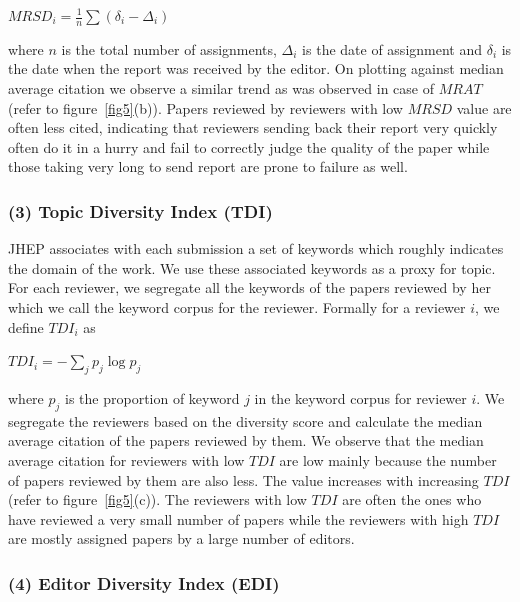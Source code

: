 \begin{center}
$MRSD_{i}=\frac{1}{n}\sum(\delta_{i}-\Delta_{i})$
\end{center}

where $n$ is the total number of assignments, $\Delta_{i}$ is the date of assignment and $\delta_{i}$ is the date when the report was received by the editor. On plotting against median average citation we observe a similar trend as was observed in case of $MRAT$ (refer to figure~\ref{fig5}(b)). Papers reviewed by reviewers with low $MRSD$ value are often less cited, indicating that reviewers sending back their report very quickly often do it in a hurry and fail to correctly judge the quality of the paper while those taking very long to send report are prone to failure as well. 

\subsubsection*{(3) Topic Diversity Index (TDI)}

JHEP associates with each submission a set of keywords which roughly indicates the domain of the work. We use these associated keywords as a proxy for topic. For each reviewer, we segregate all the keywords of the papers reviewed by her which we call the keyword corpus for the reviewer. Formally for a reviewer $i$, we define $TDI_{i}$ as 

\begin{center}
$TDI_{i}=-\sum \limits_{j} p_{j}\log p_{j}$
\end{center}

\noindent where $p_{j}$ is the proportion of keyword $j$ in the keyword corpus for reviewer $i$. We segregate the reviewers based on the diversity score and calculate the median average citation of the papers reviewed by them. We observe that the median average citation %
for reviewers with low $TDI$ are low mainly because the number of papers reviewed by them are also less. The value increases with  increasing $TDI$ (refer to figure~\ref{fig5}(c)). The reviewers with low $TDI$ are often the ones who have reviewed a very small number of papers while the reviewers with high $TDI$ are mostly assigned papers by a large number of editors. 
 
 
 
\subsubsection*{(4) Editor Diversity Index (EDI)}

